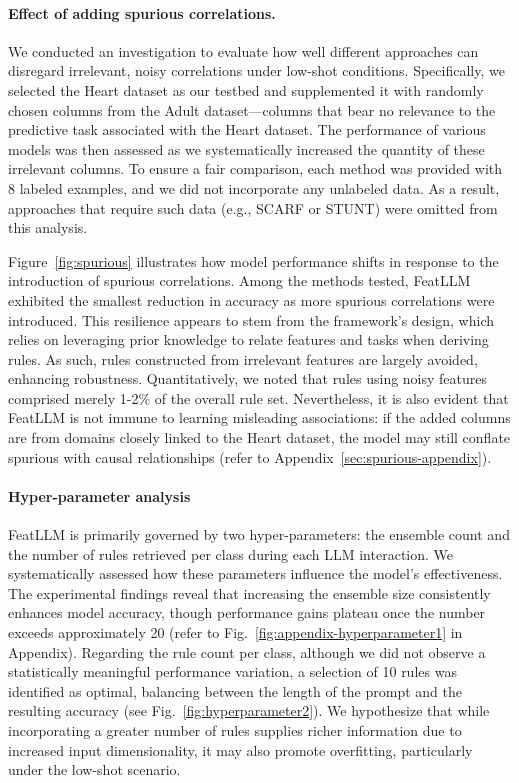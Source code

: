 \vspace*{-0.12in}
\paragraph{Effect of adding spurious correlations.} We conducted an investigation to evaluate how well different approaches can disregard irrelevant, noisy correlations under low-shot conditions. Specifically, we selected the Heart dataset as our testbed and supplemented it with randomly chosen columns from the Adult dataset—columns that bear no relevance to the predictive task associated with the Heart dataset. The performance of various models was then assessed as we systematically increased the quantity of these irrelevant columns. To ensure a fair comparison, each method was provided with 8 labeled examples, and we did not incorporate any unlabeled data. As a result, approaches that require such data (e.g., SCARF or STUNT) were omitted from this analysis.

Figure~\ref{fig:spurious} illustrates how model performance shifts in response to the introduction of spurious correlations. Among the methods tested, \textsf{FeatLLM} exhibited the smallest reduction in accuracy as more spurious correlations were introduced. This resilience appears to stem from the framework's design, which relies on leveraging prior knowledge to relate features and tasks when deriving rules. As such, rules constructed from irrelevant features are largely avoided, enhancing robustness. Quantitatively, we noted that rules using noisy features comprised merely 1-2\% of the overall rule set. Nevertheless, it is also evident that \textsf{FeatLLM} is not immune to learning misleading associations: if the added columns are from domains closely linked to the Heart dataset, the model may still conflate spurious with causal relationships (refer to Appendix~\ref{sec:spurious-appendix}).

\vspace*{-0.12in}
\paragraph{Hyper-parameter analysis}
\textsf{FeatLLM} is primarily governed by two hyper-parameters: the ensemble count and the number of rules retrieved per class during each LLM interaction. We systematically assessed how these parameters influence the model’s effectiveness. The experimental findings reveal that increasing the ensemble size consistently enhances model accuracy, though performance gains plateau once the number exceeds approximately 20 (refer to Fig.~\ref{fig:appendix-hyperparameter1} in Appendix). Regarding the rule count per class, although we did not observe a statistically meaningful performance variation, a selection of 10 rules was identified as optimal, balancing between the length of the prompt and the resulting accuracy (see Fig.~\ref{fig:hyperparameter2}). We hypothesize that while incorporating a greater number of rules supplies richer information due to increased input dimensionality, it may also promote overfitting, particularly under the low-shot scenario.

